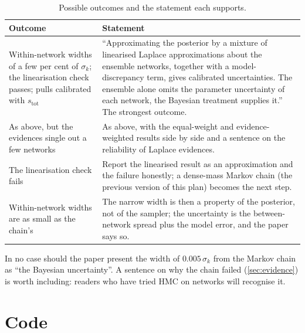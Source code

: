 \begin{table}[h]
\centering
\small
\begin{tabular}{p{}p{}}
\toprule
Outcome & Statement \\
\midrule
Within-network widths of a few per cent of $\sigma_k$; the linearisation check passes;
pulls calibrated with $s_\text{tot}$ &
``Approximating the posterior by a mixture of linearised Laplace approximations about the
ensemble networks, together with a model-discrepancy term, gives calibrated uncertainties.
The ensemble alone omits the parameter uncertainty of each network, the Bayesian treatment
supplies it.'' The strongest outcome. \\
\addlinespace
As above, but the evidences single out a few networks &
As above, with the equal-weight and evidence-weighted results side by side and a
sentence on the reliability of Laplace evidences. \\
\addlinespace
The linearisation check fails &
Report the linearised result as an approximation and the failure honestly; a dense-mass
Markov chain (the previous version of this plan) becomes the next step. \\
\addlinespace
Within-network widths are as small as the chain's &
The narrow width is then a property of the posterior, not of the sampler; the uncertainty
is the between-network spread plus the model error, and the paper says so. \\
\bottomrule
\end{tabular}
\caption{Possible outcomes and the statement each supports.}
\end{table}

In no case should the paper present the width of $0.005\,\sigma_k$ from the Markov chain as
``the Bayesian uncertainty''. A sentence on why the chain failed (\cref{sec:evidence}) is
worth including: readers who have tried HMC on networks will recognise it.

\section{Code}
\label{sec:code}

